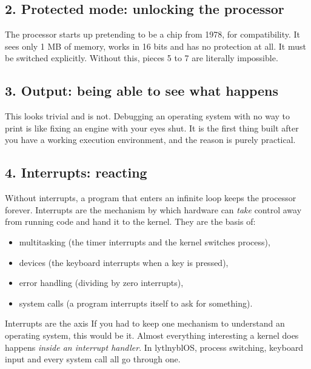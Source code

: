 \subsection{2. Protected mode: unlocking the processor}

The processor starts up pretending to be a chip from 1978, for compatibility. It sees only 1 MB of
memory, works in 16 bits and has no protection at all. It must be switched explicitly. Without
this, pieces 5 to 7 are literally impossible.

\subsection{3. Output: being able to see what happens}

This looks trivial and is not. Debugging an operating system with no way to print is like fixing
an engine with your eyes shut. It is the first thing built after you have a working execution
environment, and the reason is purely practical.

\subsection{4. Interrupts: reacting}

Without interrupts, a program that enters an infinite loop keeps the processor forever. Interrupts
are the mechanism by which hardware can \emph{take} control away from running code and hand it to
the kernel. They are the basis of:

\begin{itemize}
  \item multitasking (the timer interrupts and the kernel switches process),
  \item devices (the keyboard interrupts when a key is pressed),
  \item error handling (dividing by zero interrupts),
  \item system calls (a program interrupts itself to ask for something).
\end{itemize}

\begin{concept}{Interrupts are the axis}
If you had to keep one mechanism to understand an operating system, this would be it. Almost
everything interesting a kernel does happens \emph{inside an interrupt handler}. In lytlnyblOS,
process switching, keyboard input and every system call all go through one.
\end{concept}


